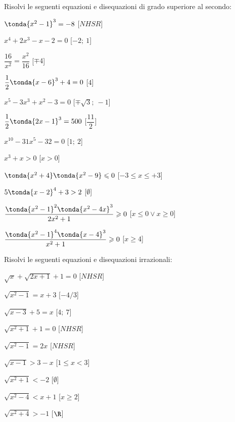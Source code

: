 \begin{esercizio}\label{ese:03.1}
Risolvi le seguenti equazioni e disequazioni di grado superiore al 
secondo:
\begin{multicols}{2}
\begin{enumeratea}
\item \(\tonda{x^2-1}^3=-8\) \hfill [\(NHSR\)]
\item \(x^4+2x^3-x-2=0\) \hfill [\(-2;~1\)]
\item \(\dfrac{16}{x^2}=\dfrac{x^2}{16}\) \hfill [\(\mp 4\)]
\item \(\dfrac{1}{2}\tonda{x-6}^3+4=0\) \hfill [\(4\)]
\item \(x^5-3x^3+x^2-3=0\) \hfill [\(\mp \sqrt{3};~-1\)]
\item \(\dfrac{1}{2}\tonda{2x-1}^3=500\) \hfill [\(\dfrac{11}{2}\)]
\item \(x^{10}-31x^5-32=0\) \hfill [\(1;~2\)]
\item \(x^3+x>0\) \hfill [\(x>0\)]
\item \(\tonda{x^2+4}\tonda{x^2-9}\leqslant 0\) 
\hfill [\(-3\leqslant x \leqslant +3\)]
\item \(5 \tonda{x-2}^4 +3> 2\) \hfill [\(\emptyset\)]
\item \(\dfrac{\tonda{x^2-1}^2\tonda{x^2-4x}^3}{2x^2+1} \geqslant 0\) 
\hfill [\(x \leqslant 0 \vee x \geqslant 0\)]
\item \(\dfrac{\tonda{x^2-1}^4\tonda{x-4}^3}{x^2+1} \geqslant 0\) 
\hfill [\(x \geqslant 4\)]
\end{enumeratea}
\end{multicols}
\end{esercizio}

\begin{esercizio}\label{ese:03.1}
Risolvi le seguenti equazioni e disequazioni irrazionali:
\begin{multicols}{2}
\begin{enumeratea}
\item \(\sqrt{x} + \sqrt{2x+1}+1 = 0\) \hfill [\(NHSR\)]
\item \(\sqrt{x^2-1} = x+3\) \hfill [\(-4 / 3\)]
\item \(\sqrt{x-3}+5 = x\) \hfill [\(4;~7\)]
\item \(\sqrt{x^2+1}+1 = 0\) \hfill [\(NHSR\)]
\item \(\sqrt{x^2-1} = 2x\) \hfill [\(NHSR\)]
\item \(\sqrt{x-1} > 3-x\) \hfill [\(1 \leqslant x < 3\)]
\item \(\sqrt{x^2 + 1} < -2\) \hfill [\(\emptyset\)]
\item \(\sqrt{x^2-4} < x+1\) \hfill [\(x \geqslant 2\)]
\item \(\sqrt{x^2+4}>-1\) \hfill [\(\R\)]
\end{enumeratea}
\end{multicols}
\end{esercizio}

